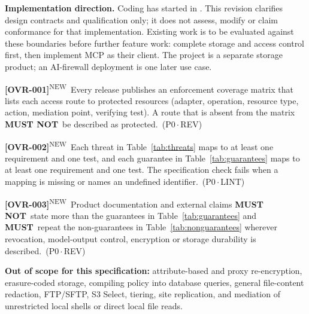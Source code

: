 \documentclass[11pt,a4paper]{article}
\newcommand{\must}{\textbf{MUST}}
\newcommand{\mustnot}{\textbf{MUST NOT}}
\newcommand{\reqtag}[2]{{\footnotesize\color{accent}(#1\,$\cdot$\,#2)}}
\newcommand{\reqn}[4]{\par\noindent\hypertarget{req:#1}{\textbf{[#1]}}\textsuperscript{\color{accent}\tiny NEW}\ #4\ \reqtag{#2}{#3}\par}
\begin{document}
\textbf{Implementation direction.} Coding has started in . This revision clarifies design contracts and qualification only; it does not assess, modify or claim conformance for that implementation. Existing work is to be evaluated against these boundaries before further feature work: complete storage and access control first, then implement MCP as their client. The project is a separate storage product; an AI-firewall deployment is one later use case.

\reqn{OVR-001}{P0}{REV}{Every release publishes an enforcement coverage matrix that lists each access route to protected resources (adapter, operation, resource type, action, mediation point, verifying test). A route that is absent from the matrix \mustnot\ be described as protected.}
\reqn{OVR-002}{P0}{LINT}{Each threat in Table~\ref{tab:threats} maps to at least one requirement and one test, and each guarantee in Table~\ref{tab:guarantees} maps to at least one requirement and one test. The specification check fails when a mapping is missing or names an undefined identifier.}
\reqn{OVR-003}{P0}{REV}{Product documentation and external claims \mustnot\ state more than the guarantees in Table~\ref{tab:guarantees} and \must\ repeat the non-guarantees in Table~\ref{tab:nonguarantees} wherever revocation, model-output control, encryption or storage durability is described.}

\textbf{Out of scope for this specification:} attribute-based and proxy re-encryption, erasure-coded storage, compiling policy into database queries, general file-content redaction, FTP/SFTP, S3 Select, tiering, site replication, and mediation of unrestricted local shells or direct local file reads.
\end{document}

